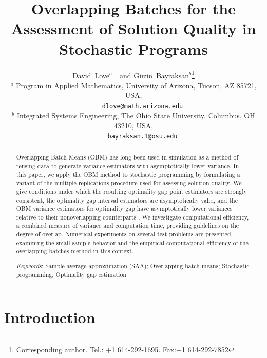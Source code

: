 \documentclass[12pt]{article}
\newcommand{\Keywords}[1]{\par\noindent 
{\small{\em Keywords\/}: #1}}
\begin{document}
\title{Overlapping Batches for the Assessment of Solution Quality in Stochastic Programs}

\author{David~Love$^{a}$\ \ and G\"{u}zin~Bayraksan$^{b}$\thanks{Corresponding author. Tel.: +1 614-292-1695. Fax:+1 614-292-7852}\\[6pt]
{\small
      $^{a}$ Program in Applied Mathematics, University of Arizona, Tucson, AZ 85721, USA,}\\
{\small \ \ \ \ \ \texttt{dlove@math.arizona.edu}} \\
{\small 
      $^{b}$ Integrated Systems Engineering, The Ohio State University, Columbus, OH 43210, USA,}\\
{\small \ \ \ \  \   \texttt{bayraksan.1@osu.edu}}}
\date{}

\maketitle

\begin{abstract}
\noindent Overlapping Batch Means (OBM) has long been used in simulation as a method of reusing data to generate variance estimators with asymptotically lower variance.
In this paper, we apply the OBM method to stochastic programming by formulating a variant of the multiple replications procedure used for assessing solution quality.
We give conditions under which the resulting optimality gap point estimators are strongly consistent, the optimality gap interval estimators are asymptotically valid, and the OBM variance estimators for optimality gap have asymptotically lower variances relative to their nonoverlapping counterparts \citep{Meketon1984,Welch1987}.
We investigate computational efficiency, a combined measure of variance and computation time, providing guidelines on the degree of overlap.  
Numerical experiments on several test problems are presented, examining the small-sample behavior and the empirical computational efficiency of the overlapping batches method in this context.  
\medskip

\Keywords{Sample average approximation (SAA); Overlapping batch means;   Stochastic programming; Optimality gap estimation}
\end{abstract}


\section{Introduction}
\label{sec:intro}
\end{document}
